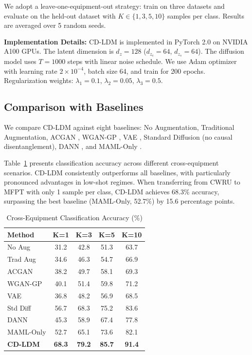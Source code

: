 \documentclass[lettersize,journal]{IEEEtran}
\begin{document}
We adopt a leave-one-equipment-out strategy: train on three datasets and evaluate on the held-out dataset with $K \in \{1, 3, 5, 10\}$ samples per class. Results are averaged over 5 random seeds.

\textbf{Implementation Details:} CD-LDM is implemented in PyTorch 2.0 on NVIDIA A100 GPUs. The latent dimension is $d_z = 128$ ($d_{z_c} = 64$, $d_{z_s} = 64$). The diffusion model uses $T = 1000$ steps with linear noise schedule. We use Adam optimizer with learning rate $2 \times 10^{-4}$, batch size 64, and train for 200 epochs. Regularization weights: $\lambda_1 = 0.1$, $\lambda_2 = 0.05$, $\lambda_3 = 0.5$.

\subsection{Comparison with Baselines}

We compare CD-LDM against eight baselines: No Augmentation, Traditional Augmentation, ACGAN \cite{ref9}, WGAN-GP \cite{ref10}, VAE \cite{ref11}, Standard Diffusion (no causal disentanglement), DANN \cite{ref12}, and MAML-Only \cite{ref13}.

Table~\ref{tab:results} presents classification accuracy across different cross-equipment scenarios. CD-LDM consistently outperforms all baselines, with particularly pronounced advantages in low-shot regimes. When transferring from CWRU to MFPT with only 1 sample per class, CD-LDM achieves 68.3\% accuracy, surpassing the best baseline (MAML-Only, 52.7\%) by 15.6 percentage points.

\begin{table}[!t]
\caption{Cross-Equipment Classification Accuracy (\%)}
\label{tab:results}
\centering
\small
\begin{tabular}{lcccc}
\hline
\textbf{Method} & \textbf{K=1} & \textbf{K=3} & \textbf{K=5} & \textbf{K=10} \\
\hline
No Aug & 31.2 & 42.8 & 51.3 & 63.7 \\
Trad Aug & 34.6 & 46.3 & 54.7 & 66.9 \\
ACGAN & 38.2 & 49.7 & 58.1 & 69.3 \\
WGAN-GP & 40.1 & 51.4 & 59.8 & 71.2 \\
VAE & 36.8 & 48.2 & 56.9 & 68.5 \\
Std Diff & 56.7 & 68.3 & 75.2 & 83.6 \\
DANN & 45.3 & 58.9 & 67.4 & 77.8 \\
MAML-Only & 52.7 & 65.1 & 73.6 & 82.1 \\
\textbf{CD-LDM} & \textbf{68.3} & \textbf{79.2} & \textbf{85.7} & \textbf{91.4} \\
\hline
\end{tabular}
\end{table}
\end{document}
